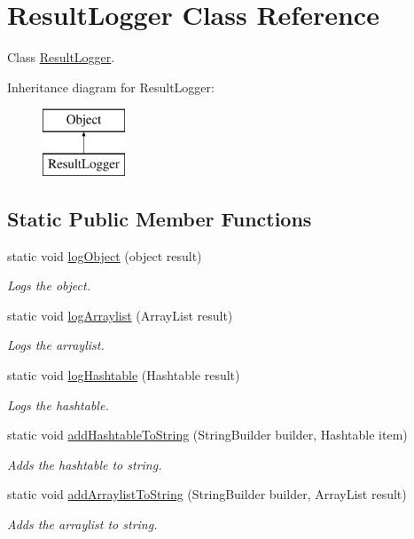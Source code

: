 \hypertarget{class_result_logger}{}\section{Result\+Logger Class Reference}
\label{class_result_logger}


Class \hyperlink{class_result_logger}{Result\+Logger}.  


Inheritance diagram for Result\+Logger\+:\begin{figure}[H]
\begin{center}
\leavevmode
\includegraphics[height=2.000000cm]{class_result_logger}
\end{center}
\end{figure}
\subsection*{Static Public Member Functions}
\begin{DoxyCompactItemize}
\item 
static void \hyperlink{class_result_logger_af419bde152200fa5abcdde26ea10c7d8}{log\+Object} (object result)
\begin{DoxyCompactList}\small\item\em Logs the object. \end{DoxyCompactList}\item 
static void \hyperlink{class_result_logger_ac15653ab60b55f041711fcb2cbeeee42}{log\+Arraylist} (Array\+List result)
\begin{DoxyCompactList}\small\item\em Logs the arraylist. \end{DoxyCompactList}\item 
static void \hyperlink{class_result_logger_af61803afb3b2bc905bd3e5643b2d893b}{log\+Hashtable} (Hashtable result)
\begin{DoxyCompactList}\small\item\em Logs the hashtable. \end{DoxyCompactList}\item 
static void \hyperlink{class_result_logger_aebd3a60183173fd32fbcb84c9ca1cbc5}{add\+Hashtable\+To\+String} (String\+Builder builder, Hashtable item)
\begin{DoxyCompactList}\small\item\em Adds the hashtable to string. \end{DoxyCompactList}\item 
static void \hyperlink{class_result_logger_af10a2cf057bfc480f11b179607748493}{add\+Arraylist\+To\+String} (String\+Builder builder, Array\+List result)
\begin{DoxyCompactList}\small\item\em Adds the arraylist to string. \end{DoxyCompactList}\end{DoxyCompactItemize}


